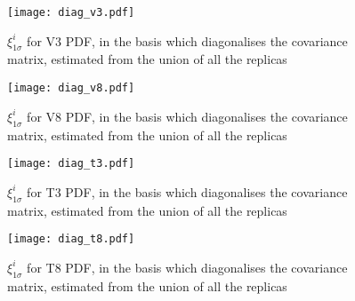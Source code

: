 \begin{figure}
    \centering
    \texttt{[image: diag\_v3.pdf]}
    \caption{
        $\xi^{i}_{1\sigma}$ for V3 PDF, in the basis which diagonalises
        the covariance matrix, estimated from the union of all the replicas
    }
    \label{fig:pdfdiagv3}
\end{figure}

\begin{figure}
    \centering
    \texttt{[image: diag\_v8.pdf]}
    \caption{
        $\xi^{i}_{1\sigma}$ for V8 PDF, in the basis which diagonalises
        the covariance matrix, estimated from the union of all the replicas
    }
    \label{fig:pdfdiagv8}
\end{figure}

\begin{figure}
    \centering
    \texttt{[image: diag\_t3.pdf]}
    \caption{
        $\xi^{i}_{1\sigma}$ for T3 PDF, in the basis which diagonalises
        the covariance matrix, estimated from the union of all the replicas
    }
    \label{fig:pdfdiagt3}
\end{figure}

\begin{figure}
    \centering
    \texttt{[image: diag\_t8.pdf]}
    \caption{
        $\xi^{i}_{1\sigma}$ for T8 PDF, in the basis which diagonalises
        the covariance matrix, estimated from the union of all the replicas
    }
    \label{fig:pdfdiagt8}
\end{figure}

